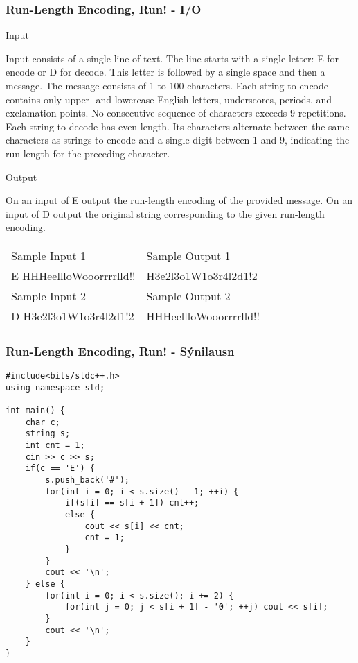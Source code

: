\documentclass{beamer}
\begin{document}
\begin{frame}
\frametitle{Run-Length Encoding, Run! - I/O}
\begin{large}
Input \\
\end{large}
\begin{small}
Input consists of a single line of text. The line starts with a single letter: E for encode or D for decode. This letter is followed by a single space and then a message. The message consists of 1 to 100 characters. Each string to encode contains only upper- and lowercase English letters, underscores, periods, and exclamation points. No consecutive sequence of characters exceeds 9 repetitions. Each string to decode has even length. Its characters alternate between the same characters as strings to encode and a single digit between 1 and 9, indicating the run length for the preceding character. \\
\end{small}
\begin{large}
Output \\
\end{large}
\begin{small}
On an input of E output the run-length encoding of the provided message. On an input of D output the original string corresponding to the given run-length encoding. \\
\begin{tabular}{ll}
Sample Input 1 & Sample Output 1 \\
E HHHeellloWooorrrrlld!!  & H3e2l3o1W1o3r4l2d1!2 \\
Sample Input 2 & Sample Output 2 \\
D H3e2l3o1W1o3r4l2d1!2 & HHHeellloWooorrrrlld!! \\
\end{tabular}
\end{small}
\end{frame}

\begin{frame}[fragile]
\frametitle{Run-Length Encoding, Run! - Sýnilausn}
\vspace*{-0.20cm}
\begin{scriptsize}
\begin{verbatim}
#include<bits/stdc++.h>
using namespace std;

int main() {
    char c;
    string s;
    int cnt = 1;
    cin >> c >> s;
    if(c == 'E') {
        s.push_back('#');
        for(int i = 0; i < s.size() - 1; ++i) {
            if(s[i] == s[i + 1]) cnt++;
            else {
                cout << s[i] << cnt;
                cnt = 1;
            }
        }
        cout << '\n';
    } else {
        for(int i = 0; i < s.size(); i += 2) {
            for(int j = 0; j < s[i + 1] - '0'; ++j) cout << s[i];
        }
        cout << '\n';
    }
}
\end{verbatim}
\end{scriptsize}
\end{frame}
\end{document}
